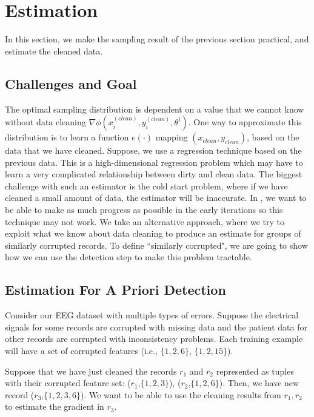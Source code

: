 \section{Estimation}\label{sampling}
In this section, we make the sampling result of the previous section practical,
and estimate the cleaned data.

\subsection{Challenges and Goal}
The optimal sampling distribution is dependent on a value that we cannot know without data cleaning $\nabla\phi(x^{(clean)}_i,y^{(clean)}_i,\theta^t)$.
One way to approximate this distribution is to learn a function $e(\cdot)$ mapping $(x_{clean}, y_{clean})$, based on the data that we have cleaned.
Suppose, we use a regression technique based on the previous data.
This is a high-dimensional regression problem which may have to learn a very complicated relationship between dirty and clean data.
The biggest challenge with such an estimator is the cold start problem, where if we have cleaned a small amount of data, the estimator will be inaccurate.
In \sys, we want to be able to make as much progress as possible in the early iterations so this technique may not work.
We take an alternative approach, where we try to exploit what we know about data cleaning to produce an estimate for groups of similarly corrupted records.
To define ``similarly corrupted", we are going to show how we can use the detection step to make this problem tractable.

\subsection{Estimation For A Priori Detection}
\begin{example}
Consider our EEG dataset with multiple types of errors. 
Suppose the electrical signals for some records are corrupted with missing data and the patient data for other records are corrupted with inconsistency problems. 
Each training example will have a set of corrupted features (i.e., $\{1,2,6\}$, $\{1,2,15\}$).

Suppose that we have just cleaned the records $r_1$ and $r_2$ represented as tuples with their corrupted feature set: ($r_1$,$\{1,2,3\}$), ($r_2$,$\{1,2,6\}$).
Then, we have new record ($r_3$,$\{1,2,3,6\}$). 
We want to be able to use the cleaning results from $r_1,r_2$ to estimate the gradient in $r_3$.
\end{example}

